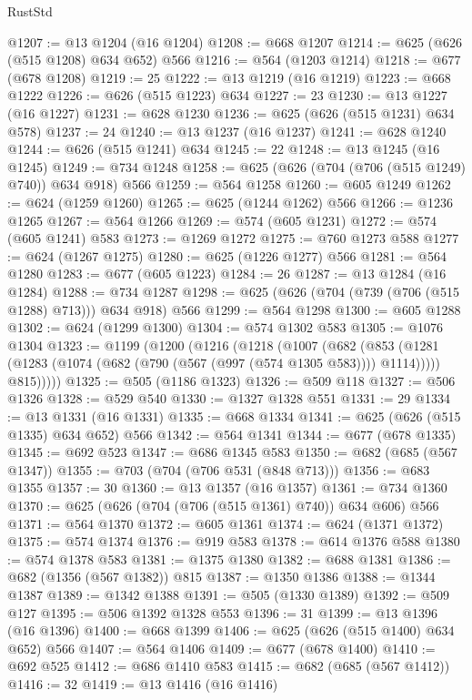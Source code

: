 \begin{lexlean}{RustStd}
\begin{coremodule}
@1207 := @13 @1204 (@16 @1204)
@1208 := @668 @1207
@1214 := @625 (@626 (@515 @1208) @634 @652) @566
@1216 := @564 (@1203 @1214)
@1218 := @677 (@678 @1208)
@1219 := 25
@1222 := @13 @1219 (@16 @1219)
@1223 := @668 @1222
@1226 := @626 (@515 @1223) @634
@1227 := 23
@1230 := @13 @1227 (@16 @1227)
@1231 := @628 @1230
@1236 := @625 (@626 (@515 @1231) @634 @578)
@1237 := 24
@1240 := @13 @1237 (@16 @1237)
@1241 := @628 @1240
@1244 := @626 (@515 @1241) @634
@1245 := 22
@1248 := @13 @1245 (@16 @1245)
@1249 := @734 @1248
@1258 := @625 (@626 (@704 (@706 (@515 @1249) @740)) @634 @918) @566
@1259 := @564 @1258
@1260 := @605 @1249
@1262 := @624 (@1259 @1260)
@1265 := @625 (@1244 @1262) @566
@1266 := @1236 @1265
@1267 := @564 @1266
@1269 := @574 (@605 @1231)
@1272 := @574 (@605 @1241) @583
@1273 := @1269 @1272
@1275 := @760 @1273 @588
@1277 := @624 (@1267 @1275)
@1280 := @625 (@1226 @1277) @566
@1281 := @564 @1280
@1283 := @677 (@605 @1223)
@1284 := 26
@1287 := @13 @1284 (@16 @1284)
@1288 := @734 @1287
@1298 := @625 (@626 (@704 (@739 (@706 (@515 @1288) @713))) @634 @918) @566
@1299 := @564 @1298
@1300 := @605 @1288
@1302 := @624 (@1299 @1300)
@1304 := @574 @1302 @583
@1305 := @1076 @1304
@1323 := @1199
    (@1200
      (@1216
        (@1218
          (@1007
            (@682
              (@853 (@1281 (@1283 (@1074 (@682 (@790 (@567 (@997 (@574 @1305 @583)))) @1114)))))
              @815)))))
@1325 := @505 (@1186 @1323)
@1326 := @509 @118
@1327 := @506 @1326
@1328 := @529 @540
@1330 := @1327 @1328 @551
@1331 := 29
@1334 := @13 @1331 (@16 @1331)
@1335 := @668 @1334
@1341 := @625 (@626 (@515 @1335) @634 @652) @566
@1342 := @564 @1341
@1344 := @677 (@678 @1335)
@1345 := @692 @523
@1347 := @686 @1345 @583
@1350 := @682 (@685 (@567 @1347))
@1355 := @703 (@704 (@706 @531 (@848 @713)))
@1356 := @683 @1355
@1357 := 30
@1360 := @13 @1357 (@16 @1357)
@1361 := @734 @1360
@1370 := @625 (@626 (@704 (@706 (@515 @1361) @740)) @634 @606) @566
@1371 := @564 @1370
@1372 := @605 @1361
@1374 := @624 (@1371 @1372)
@1375 := @574 @1374
@1376 := @919 @583
@1378 := @614 @1376 @588
@1380 := @574 @1378 @583
@1381 := @1375 @1380
@1382 := @688 @1381
@1386 := @682 (@1356 (@567 @1382)) @815
@1387 := @1350 @1386
@1388 := @1344 @1387
@1389 := @1342 @1388
@1391 := @505 (@1330 @1389)
@1392 := @509 @127
@1395 := @506 @1392 @1328 @553
@1396 := 31
@1399 := @13 @1396 (@16 @1396)
@1400 := @668 @1399
@1406 := @625 (@626 (@515 @1400) @634 @652) @566
@1407 := @564 @1406
@1409 := @677 (@678 @1400)
@1410 := @692 @525
@1412 := @686 @1410 @583
@1415 := @682 (@685 (@567 @1412))
@1416 := 32
@1419 := @13 @1416 (@16 @1416)

\end{coremodule}
\end{lexlean}
